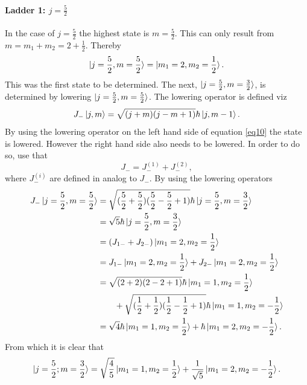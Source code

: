 \begin{example}
\begin{enumerate}
		\paragraph{Ladder 1: $j=\frac{5}{2}$}
		In the case of $j=\frac{5}{2}$ the highest state is $m=\frac{5}{2}$. This can only result from $m=m_1+m_2=2+\frac{1}{2}$. Thereby
		\begin{equation}
			\ket{j=\frac{5}{2},m=\frac{5}{2}}=\ket{m_1=2,m_2=\frac{1}{2}}.
			\label{eq10}
		\end{equation} 
		This was the first state to be determined. The next, $\ket{j=\frac{5}{2},m=\frac{3}{2}}$, is determined by lowering $\ket{j=\frac{5}{2},m=\frac{5}{2}}$. The lowering operator is defined viz
		\begin{equation}
			J_-\ket{j,m}=\sqrt{(j+m)(j-m+1)}\hbar\ket{j,m-1}.
		\end{equation} 
		By using the lowering operator on the left hand side of equation \ref{eq10} the state is lowered. However the right hand side also needs to be lowered. In order to do so, use that
		\begin{equation}
			J_-=J^{(1)}_-+J^{(2)}_-,
		\end{equation} 
		where $J^{(i)}_-$ are defined in analog to $J_-$. By using the lowering operators
		\begin{equation}
			\begin{split}
				J_-\ket{j=\frac{5}{2}, m=\frac{5}{2}}&=\sqrt{(\frac{5}{2}+\frac{5}{2})(\frac{5}{2}-\frac{5}{2}+1)}\hbar\ket{j=\frac{5}{2},m=\frac{3}{2}}\\
				&=\sqrt{5}\hbar\ket{j=\frac{5}{2},m=\frac{3}{2}}\\
				&=(J_{1-}+J_{2-})\ket{m_1=2,m_2=\frac{1}{2}}\\
				&=J_{1-}\ket{m_1=2,m_2=\frac{1}{2}}+J_{2-}\ket{m_1=2,m_2=\frac{1}{2}}\\
				&=\sqrt{(2+2)(2-2+1)}\hbar\ket{m_1=1,m_2=\frac{1}{2}}\\
				&\qquad+\sqrt{(\frac{1}{2}+\frac{1}{2})(\frac{1}{2}-\frac{1}{2}+1)}\hbar\ket{m_1=1,m_2=-\frac{1}{2}}\\
				&=\sqrt{4}\hbar\ket{m_1=1,m_2=\frac{1}{2}}+\hbar\ket{m_1=2,m_2=-\frac{1}{2}}.\\
			\end{split}
		\end{equation} 
		From which it is clear that
		\begin{equation}
			\ket{j=\frac{5}{2};m=\frac{3}{2}}=\sqrt{\frac{4}{5}}\ket{m_1=1,m_2=\frac{1}{2}}+\frac{1}{\sqrt{5}}\ket{m_1=2,m_2=-\frac{1}{2}}.
		\end{equation} 
		

\end{enumerate}
\end{example}
